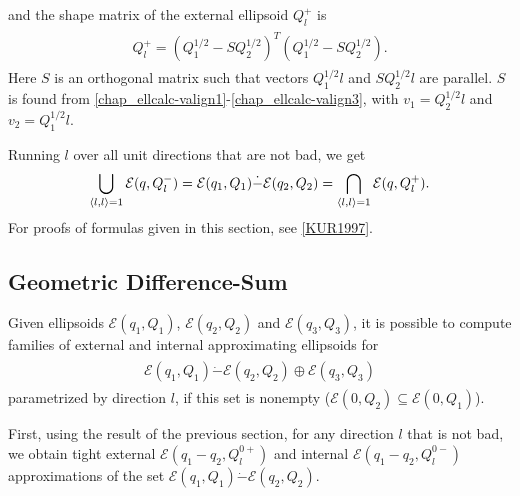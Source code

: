 \documentclass[letterpaper,10pt,english]{sphinxmanual}
\begin{document}
and the shape matrix of the external ellipsoid \(Q^+_l\) is
\label{chap_ellcalc:equation-minkdiff_ea}\begin{gather}
\begin{split}Q^+_l = \left(Q_1^{1/2} - SQ_2^{1/2}\right)^T
\left(Q_1^{1/2} - SQ_2^{1/2}\right).\end{split}\label{chap_ellcalc-minkdiff_ea}
\end{gather}
Here \(S\) is an orthogonal matrix such that vectors
\(Q_1^{1/2}l\) and \(SQ_2^{1/2}l\) are parallel. \(S\) is
found from \eqref{chap_ellcalc-valign1}-\eqref{chap_ellcalc-valign3}, with \(v_1=Q_2^{1/2}l\) and
\(v_2=Q_1^{1/2}l\).

Running \(l\) over all unit directions that are not bad, we get
\begin{gather}
\begin{split}\bigcup_{\langle l,l\rangle=1} {\mathcal E}(q,Q_l^-) =
{\mathcal E}(q_1,Q_1)\dot{-}{\mathcal E}(q_2,Q_2) =
\bigcap_{\langle l,l\rangle=1} {\mathcal E}(q,Q_l^+) .\end{split}\notag
\end{gather}
For proofs of formulas given in this section, see {\hyperref[chap_intro:kur1997]{{[}KUR1997{]}}}.


\subsection{Geometric Difference-Sum}
\label{chap_ellcalc:diff-sum-label}\label{chap_ellcalc:geometric-difference-sum}
Given ellipsoids \({\mathcal E}(q_1,Q_1)\),
\({\mathcal E}(q_2,Q_2)\) and \({\mathcal E}(q_3,Q_3)\), it is
possible to compute families of external and internal approximating
ellipsoids for
\label{chap_ellcalc:equation-minkmp}\begin{gather}
\begin{split}{\mathcal E}(q_1,Q_1) \dot{-} {\mathcal E}(q_2,Q_2) \oplus {\mathcal E}(q_3,Q_3)\end{split}\label{chap_ellcalc-minkmp}
\end{gather}
parametrized by direction \(l\), if this set is nonempty
(\({\mathcal E}(0,Q_2)\subseteq{\mathcal E}(0,Q_1)\)).

First, using the result of the previous section, for any direction
\(l\) that is not bad, we obtain tight external
\({\mathcal E}(q_1-q_2, Q_l^{0+})\) and internal
\({\mathcal E}(q_1-q_2, Q_l^{0-})\) approximations of the set
\({\mathcal E}(q_1,Q_1)\dot{-}{\mathcal E}(q_2,Q_2)\).
\end{document}
